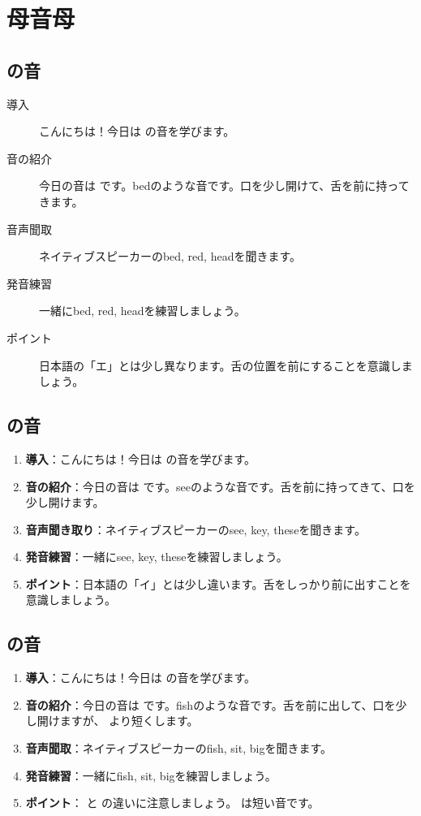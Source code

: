 \documentclass[book,jafontscale=0.9247]{jlreq}
\begin{document}
\tableofcontents
\clearpage
\chapter{母音母}

\section{\textipa{/\textepsilon /} の音}
\begin{description}
    \item[導入]こんにちは！今日は \textipa{/\textepsilon /}の音を学びます。
    \item[音の紹介]今日の音は \textipa{/\textepsilon /} です。bedのような音です。口を少し開けて、舌を前に持ってきます。
    \item[音声聞取]ネイティブスピーカーのbed, red, headを聞きます。
    \item[発音練習]一緒にbed, red, headを練習しましょう。
    \item[ポイント] 日本語の「エ」とは少し異なります。舌の位置を前にすることを意識しましょう。
\end{description}

\section{ の音}
\begin{enumerate}
    \item \textbf{導入}：こんにちは！今日は  の音を学びます。
    \item \textbf{音の紹介}：今日の音は  です。seeのような音です。舌を前に持ってきて、口を少し開けます。
    \item \textbf{音声聞き取り}：ネイティブスピーカーのsee, key, theseを聞きます。
    \item \textbf{発音練習}：一緒にsee, key, theseを練習しましょう。
    \item \textbf{ポイント}：日本語の「イ」とは少し違います。舌をしっかり前に出すことを意識しましょう。
\end{enumerate}

\section{\textipa{/\textsci /} の音}
\begin{enumerate}
    \item \textbf{導入}：こんにちは！今日は \textipa{/\textsci /} の音を学びます。
    \item \textbf{音の紹介}：今日の音は \textipa{/\textsci /} です。fishのような音です。舌を前に出して、口を少し開けますが、 より短くします。
    \item \textbf{音声聞取}：ネイティブスピーカーのfish, sit, bigを聞きます。
    \item \textbf{発音練習}：一緒にfish, sit, bigを練習しましょう。
    \item \textbf{ポイント}： と  の違いに注意しましょう。  は短い音です。
\end{enumerate}
\end{document}
